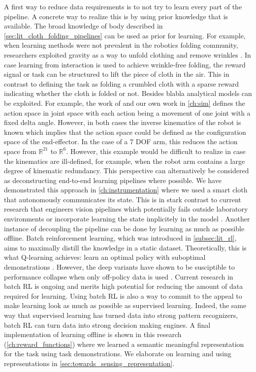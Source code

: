 \documentclass[\home/main.tex]{subfiles}
\begin{document}
A first way to reduce data requirements is to not try to learn every part of the pipeline. A concrete way to realize this is by using prior knowledge that is available.  
The broad knowledge of body described in \cref{sec:lit_cloth_folding_pipelines} can be used as prior for learning. For example, when learning methods were not prevalent in the robotics folding community, researchers exploited gravity as a way to unfold clothing and remove wrinkles \autocite{Doumanoglou2016,Maitin2010}. In case learning from interaction is used to achieve wrinkle-free folding, the reward signal or task can be structured to lift the piece of cloth in the air. This in contrast to defining the task as folding a crumbled cloth with a sparse reward indicating whether the cloth is folded or not. 
Besides blabla analytical models can be exploited. For example, the work of \textcite{Zhang2015} and our own work in \cref{ch:sim} defines the action space in joint space with each action being a movement of one joint with a fixed delta angle. However, in both cases the inverse kinematics of the robot is known which implies that the action space could be defined as the configuration space of the end-effector. In the case of a 7 \gls{DOF} arm, this reduces the action space from $\mathbb{R}^{21}$ to $\mathbb{R}^6$. However, this example would be difficult to realize in case the kinematics are ill-defined, for example, when the robot arm contains a large degree of kinematic redundancy. 
This perspective can alternatively be considered as deconstructing end-to-end learning pipelines where possible. We have demonstrated this approach in \cref{ch:instrumentation} where we used a smart cloth that autonomously communicates its state. This is in stark contrast to current research that engineers vision pipelines \autocite{Wu2020} which potentially fails outside laboratory environments or incorporate learning the state implicitely in the model \autocite{Matas2018}. 
Another instance of decoupling the pipeline can be done by learning as much as possible offline. Batch reinforcement learning, which was introduced in \cref{subsec:lit_rl}, aims to maximally distill the knowledge in a static dataset. Theoretically, this is what Q-learning achieves: learn an optimal policy with suboptimal demonstrations \autocite{Sutton2018}. However, the deep variants have shown to be susciptible to performance collapse when only off-policy data is used \autocite{hausknecht2016policy}. Current research in batch RL is ongoing and merits high potential for reducing the amount of data required for learning. Using batch RL is also a way to commit to the appeal to make learning look as much as possible as supervised learning. Indeed, the same way that supervised learning has turned data into strong pattern recognizers, batch RL can turn data into strong decision making engines. 
A final implementation of learning offline is shown in this research (\cref{ch:reward_functions}) where we learned a semantic meaningful representation for the task using task demonstrations. We elaborate on learning and using representations in \cref{sec:towards_sensing_representation}. 
\end{document}
